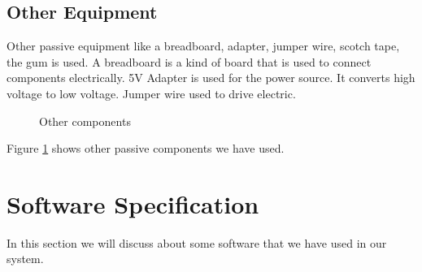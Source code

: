 \subsection{Other Equipment}
Other passive equipment like a breadboard, adapter, jumper wire, scotch tape, the gum is used. A breadboard is a kind of board that is used to connect components electrically. 5V Adapter is used for the power source. It converts high voltage to low voltage. Jumper wire used to drive electric.
\begin{figure}[h]
\centering
{} 
\hspace{1cm}
\hspace{1cm}

\caption{Other components}
\label{Other1}
\end{figure}
Figure \ref{Other1} shows other passive components we have used.


\section{Software Specification}
In this section we will discuss about some software that we have used in our system.
